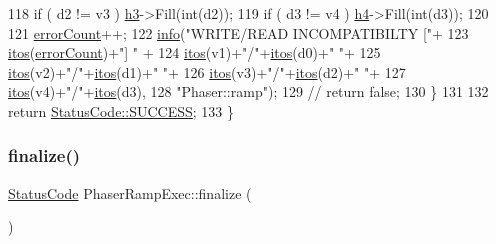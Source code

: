\begin{DoxyCode}
118     \textcolor{keywordflow}{if} ( d2 != v3 ) \hyperlink{classPhaserRampExec_ad9ec4185f676732648c4886f28c9c6b7}{h3}->Fill(\textcolor{keywordtype}{int}(d2));
119     \textcolor{keywordflow}{if} ( d3 != v4 ) \hyperlink{classPhaserRampExec_aa487df389ad66093dba562f27f558128}{h4}->Fill(\textcolor{keywordtype}{int}(d3));
120 
121     \hyperlink{classPhaserRampExec_a3f09b8bf4cd8f5425adf8ae168d39e50}{errorCount}++;
122     \hyperlink{classObject_a644fd329ea4cb85f54fa6846484b84a8}{info}(\textcolor{stringliteral}{"WRITE/READ INCOMPATIBILTY ["}+
123          \hyperlink{Tools_8h_af330027dbdafb9a30768b3613c553e60}{itos}(\hyperlink{classPhaserRampExec_a3f09b8bf4cd8f5425adf8ae168d39e50}{errorCount})+\textcolor{stringliteral}{"] "} +
124          \hyperlink{Tools_8h_af330027dbdafb9a30768b3613c553e60}{itos}(v1)+\textcolor{stringliteral}{"/"}+\hyperlink{Tools_8h_af330027dbdafb9a30768b3613c553e60}{itos}(d0)+\textcolor{stringliteral}{" "}+
125          \hyperlink{Tools_8h_af330027dbdafb9a30768b3613c553e60}{itos}(v2)+\textcolor{stringliteral}{"/"}+\hyperlink{Tools_8h_af330027dbdafb9a30768b3613c553e60}{itos}(d1)+\textcolor{stringliteral}{" "}+
126          \hyperlink{Tools_8h_af330027dbdafb9a30768b3613c553e60}{itos}(v3)+\textcolor{stringliteral}{"/"}+\hyperlink{Tools_8h_af330027dbdafb9a30768b3613c553e60}{itos}(d2)+\textcolor{stringliteral}{" "}+
127          \hyperlink{Tools_8h_af330027dbdafb9a30768b3613c553e60}{itos}(v4)+\textcolor{stringliteral}{"/"}+\hyperlink{Tools_8h_af330027dbdafb9a30768b3613c553e60}{itos}(d3),
128          \textcolor{stringliteral}{"Phaser::ramp"});
129     \textcolor{comment}{//     return false;}
130   \}
131   
132   \textcolor{keywordflow}{return} \hyperlink{classStatusCode_a6f565cbeadc76d14c72f047e5e85eb4badd0da38d3ba0d922efd1f4619bc37ad8}{StatusCode::SUCCESS};
133 \}
\end{DoxyCode}
\mbox{\label{classPhaserRampExec_a8849cacdd34e7ca56f6d5e7668fe8c6c}} 
\subsubsection{\texorpdfstring{finalize()}{finalize()}}
{\footnotesize\ttfamily \hyperlink{classStatusCode}{Status\+Code} Phaser\+Ramp\+Exec\+::finalize (\begin{DoxyParamCaption}{ }\end{DoxyParamCaption})\hspace{0.3cm}{\ttfamily [virtual]}}

